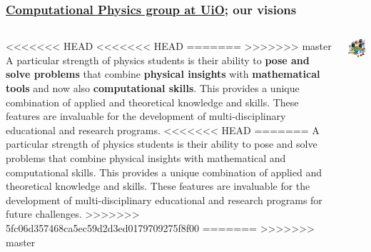 \documentclass{beamer}
\begin{document}
\begin{frame}
\frametitle{\href{{http://www.mn.uio.no/fysikk/english/research/groups/computational/index.html}}{Computational Physics group at UiO}; our visions}

\begin{columns}
\begin{block}{}
<<<<<<< HEAD
<<<<<<< HEAD
=======
>>>>>>> master
A particular strength of physics students is their ability to \textbf{pose and
solve problems} that combine \textbf{physical insights} with \textbf{mathematical tools}
and now also \textbf{computational skills}. This provides a unique combination
of applied and theoretical knowledge and skills. These features are invaluable
for the development of multi-disciplinary educational and research programs.
<<<<<<< HEAD
=======
A particular strength of physics students is their ability to pose and
solve problems that combine physical insights with mathematical
and  computational skills. This provides a unique combination
of applied and theoretical knowledge and skills. These features are invaluable 
for the development of multi-disciplinary educational and research programs for future challenges. 
>>>>>>> 5fc06d357468ca5ec59d2d3ed0179709275f8f00
=======
>>>>>>> master
\end{block}

\centerline{\includegraphics[width=1.0\linewidth]{fig-future/computer_nerd2.jpg}}



\end{columns}
\end{frame}
\end{document}
